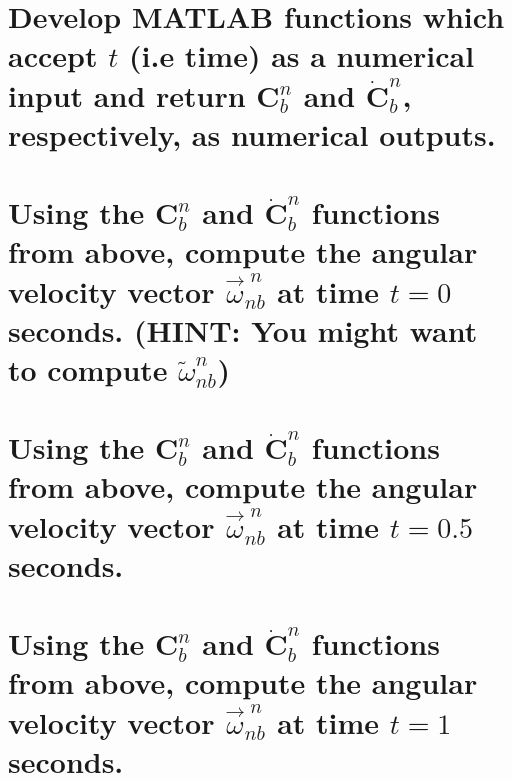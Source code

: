 \documentclass[12pt,letterpaper, onecolumn]{exam}
\begin{document}
\begin{questions}
\begin{parts}
        \part{Develop MATLAB functions which accept $t$ (i.e time) as a numerical input and return $\mathbf{C}^n_b$ and $\dot{\mathbf{C}}^n_b$, respectively, as numerical outputs.}

        \part{Using the $\mathbf{C}^n_b$ and $\dot{\mathbf{C}}^n_b$ functions from above, compute the angular velocity vector $\vec{\omega}^{\;n}_{nb}$ at time $t = 0$ seconds. (HINT: You might want to compute $\tilde{\omega}^{n}_{nb}$)}
        \begin{subparts}

        \end{subparts}

        \part{Using the $\mathbf{C}^n_b$ and $\dot{\mathbf{C}}^n_b$ functions from above, compute the angular velocity vector $\vec{\omega}^{\;n}_{nb}$ at time $t = 0.5$ seconds.}
        \begin{subparts}

        \end{subparts}
        \part{Using the $\mathbf{C}^n_b$ and $\dot{\mathbf{C}}^n_b$ functions from above, compute the angular velocity vector $\vec{\omega}^{\;n}_{nb}$ at time $t = 1$ seconds.}
        \begin{subparts}

        \end{subparts}


\end{parts}
\end{questions}
\end{document}
